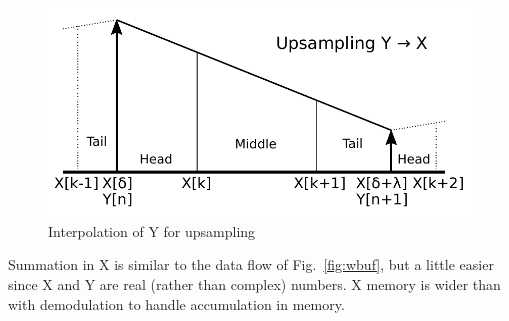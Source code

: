 \begin{figure}
	\centering
	\includegraphics[width=0.8\linewidth]{../source/upsam_e}
	\caption[X interpolation]{Interpolation of Y for upsampling}
	\label{fig:upsam}
\end{figure}

Summation in X is similar to the data flow of Fig.~\ref{fig:wbuf},
but a little easier since X and Y are real (rather than complex) numbers.
X memory is wider than with demodulation to handle accumulation in memory.
